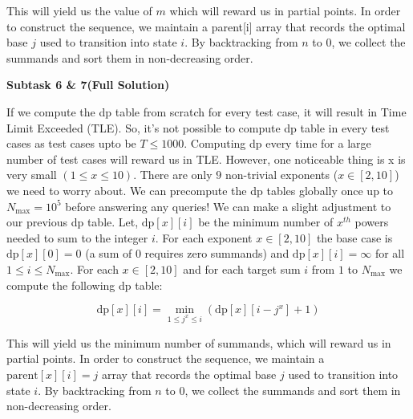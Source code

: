 \documentclass[12pt]{article}
\begin{document}
 This will yield us the value of $m$ which will reward us in partial points. In order to construct the sequence, we maintain a parent[i] array that records the optimal base $j$ used to transition into state $i$. By backtracking from $n$ to $0$, we collect the summands and sort them in non-decreasing order. 

\vspace{0.3cm}


 \textbf{\large Subtask 6 \& 7(Full Solution)}

\vspace{0.3cm}

If we compute the dp table from scratch for every test case, it will result in Time Limit Exceeded (TLE). So, it's not possible to compute dp table in every test cases as test cases upto be $T\le1000$. Computing dp every time for a large number of test cases will reward us in TLE.  However, one noticeable thing is x is very small $(1\le x \le10)$. There are only $9$ non-trivial exponents ($x \in [2, 10]$) we need to worry about. We can precompute the dp tables globally once up to $N_{\max} = 10^5$ before answering any queries! We can make a slight adjustment to our previous dp table. Let, $\text{dp}[x][i]$ be the minimum number of $x^{th}$ powers needed to sum to the integer $i$. For each exponent $x \in [2, 10]$ the base case is $\text{dp}[x][0] = 0$ (a sum of $0$ requires zero summands) and $\text{dp}[x][i] = \infty$ for all $1 \le i \le N_{\max}$. For each $x \in [2, 10]$ and for each target sum $i$ from $1$ to $N_{\max}$ we compute the following dp table:

$$\text{dp}[x][i] = \min_{1 \le j^x \le i} (\text{dp}[x][i - j^x] + 1)$$

This will yield us the minimum number of summands, which will reward us in partial points. In order to construct the sequence, we maintain a $\text{parent}[x][i] = j$ array that records the optimal base $j$ used to transition into state $i$. By backtracking from $n$ to $0$, we collect the summands and sort them in non-decreasing order. 







\vspace{0.3cm}
\end{document}
